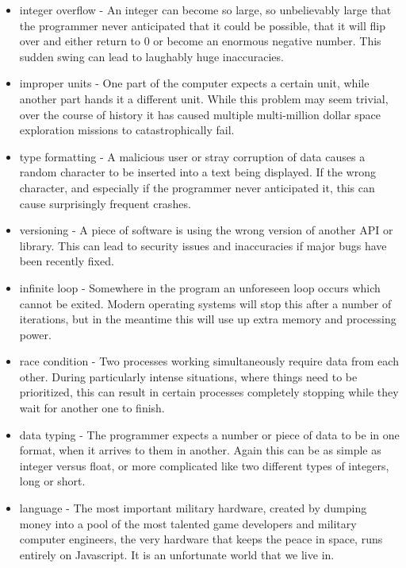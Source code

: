 \documentclass[a4paper]{article}
\begin{document}
\begin{minipage}[t]{0.45\linewidth}
\begin{itemize}[leftmargin=0cm]
\item integer overflow - An integer can become so large, so unbelievably large that the programmer never anticipated that it could be possible, that it will flip over and either return to 0 or become an enormous negative number. This sudden swing can lead to laughably huge inaccuracies. 
\item improper units - One part of the computer expects a certain unit, while another part hands it a different unit. While this problem may seem trivial, over the course of history it has caused multiple multi-million dollar space exploration missions to catastrophically fail.
\item type formatting - A malicious user or stray corruption of data causes a random character to be inserted into a text being displayed. If the wrong character, and especially if the programmer never anticipated it, this can cause surprisingly frequent crashes.
\item versioning - A piece of software is using the wrong version of another API or library. This can lead to security issues and inaccuracies if major bugs have been recently fixed. 
\end{itemize}
\end{minipage}
\begin{minipage}[t]{0.5\linewidth}
\begin{itemize}[leftmargin=0.5cm]
\item infinite loop - Somewhere in the program an unforeseen loop occurs which cannot be exited. Modern operating systems will stop this after a number of iterations, but in the meantime this will use up extra memory and processing power.
\item race condition - Two processes working simultaneously require data from each other. During particularly intense situations, where things need to be prioritized, this can result in certain processes completely stopping while they wait for another one to finish.
\item data typing - The programmer expects a number or piece of data to be in one format, when it arrives to them in another. Again this can be as simple as integer versus float, or more complicated like two different types of integers, long or short.
\item language - The most important military hardware, created by dumping money into a pool of the most talented game developers and military computer engineers, the very hardware that keeps the peace in space, runs entirely on Javascript. It is an unfortunate world that we live in.
\end{itemize}
\end{minipage}
\end{document}
